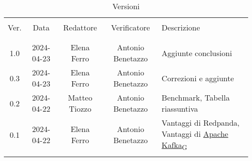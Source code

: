 \documentclass[italian,12pt]{article}
\begin{document}

\newpage


\begin{table}[!h]
	\caption*{Versioni}
	\begin{center}
		\begin{tabular}{ c c c c p{6.1cm} }
			\hline                                                                                                 \\[-2ex]
			Ver. & Data       & Redattore     & Verificatore      & Descrizione                                    \\
			\\[-2ex] \hline \\[-1.5ex]
			1.0  & 2024-04-23 & Elena Ferro   & Antonio Benetazzo & Aggiunte conclusioni                           \\
			0.3  & 2024-04-23 & Elena Ferro   & Antonio Benetazzo & Correzioni e aggiunte                          \\
			0.2  & 2024-04-22 & Matteo Tiozzo & Antonio Benetazzo & Benchmark, Tabella riassuntiva                 \\
			0.1  & 2024-04-22 & Elena Ferro   & Antonio Benetazzo & Vantaggi di Redpanda, Vantaggi di \href{https://7last.github.io/docs/rtb/documentazione-interna/glossario\#apache-kafka}{Apache Kafka\textsubscript{G}} \\
			\\[-1.5ex] \hline
		\end{tabular}
	\end{center}
\end{table}

\newpage
\tableofcontents
\listoftables
\listoffigures
\newpage












\end{document}

